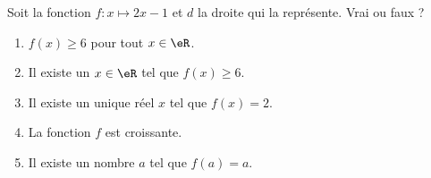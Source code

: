 
\begin{exercice}\label{exosmath-0135}

    Soit la fonction \( f\colon x\mapsto 2x-1\) et \( d\) la droite qui la représente. Vrai ou faux ?
    \begin{enumerate}
        \item
            \( f(x)\geq 6\) pour tout \( x\in \eR\).
        \item
            Il existe un \( x\in \eR\) tel que \( f(x)\geq 6\).
        \item
            Il existe un unique réel \( x\) tel que \( f(x)=2\).
        \item
            La fonction \( f\) est croissante.
        \item
            Il existe un nombre \( a\) tel que \( f(a)=a\).
    \end{enumerate}

\end{exercice}
